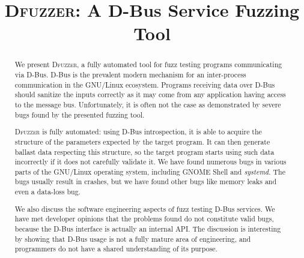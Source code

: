 \documentclass[conference]{IEEEtran}
\begin{document}
%
\title{\textbf{\textsc{Dfuzzer}: A D-Bus Service Fuzzing Tool}}

\author{
\vspace{5pt}
\vspace{5pt}
}


\maketitle


\begin{abstract}
We present \textsc{Dfuzzer}, a fully automated tool for fuzz testing programs
communicating via D-Bus. D-Bus is the prevalent modern mechanism for an
inter-process communication in the GNU/Linux ecosystem. Programs receiving data
over D-Bus should sanitize the inputs correctly as it may come from any
application having access to the message bus. Unfortunately, it is often not
the case as demonstrated by severe bugs found by the presented fuzzing tool.

\textsc{Dfuzzer} is fully automated: using D-Bus introspection, it is able to
acquire the structure of the parameters expected by the target program. It can
then generate ballast data respecting this structure, so the target program
starts using such data incorrectly if it does not carefully validate it.  We
have found numerous bugs in various parts of the GNU/Linux operating system,
including GNOME Shell and \textit{systemd}. The bugs usually result in
crashes, but we have found other bugs like memory leaks and even a data-loss
bug.

We also discuss the software engineering aspects of fuzz testing D-Bus
services.  We have met developer opinions that the problems found do not
constitute valid bugs, because the D-Bus interface is actually an internal API.
The discussion is interesting by showing that D-Bus usage is not a fully mature
area of engineering, and programmers do not have a shared understanding of its
purpose.
\end{abstract}
\end{document}
